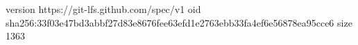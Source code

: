 version https://git-lfs.github.com/spec/v1
oid sha256:33f03e47bd3abbf27d83e8676fee63efd1e2763ebb33fa4ef6e56878ea95cce6
size 1363
